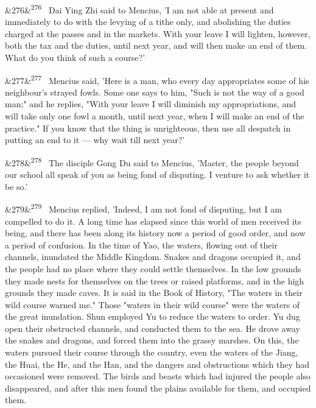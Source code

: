 \documentclass[12pt]{article}
\newcommand{\para}[1][]{\par\noindent\ifx&#1&\else\textsuperscript{\footnotesize #1}~\fi}
\begin{document}
\para[276] Dai Ying Zhi said to Mencius, 'I am not able at present and immediately to do with the levying of a tithe only, and abolishing the duties charged at the passes and in the markets. With your leave I will lighten, however, both the tax and the duties, until next year, and will then make an end of them. What do you think of such a course?'

\para[277] Mencius said, 'Here is a man, who every day appropriates some of his neighbour's strayed fowls. Some one says to him, "Such is not the way of a good man;" and he replies, "With your leave I will diminish my appropriations, and will take only one fowl a month, until next year, when I will make an end of the practice." If you know that the thing is unrighteous, then use all despatch in putting an end to it --- why wait till next year?'

\para[278] The disciple Gong Du said to Mencius, 'Master, the people beyond our school all speak of you as being fond of disputing. I venture to ask whether it be so.'

\para[279] Mencius replied, 'Indeed, I am not fond of disputing, but I am compelled to do it. A long time has elapsed since this world of men received its being, and there has been along its history now a period of good order, and now a period of confusion. In the time of Yao, the waters, flowing out of their channels, inundated the Middle Kingdom. Snakes and dragons occupied it, and the people had no place where they could settle themselves. In the low grounds they made nests for themselves on the trees or raised platforms, and in the high grounds they made caves. It is said in the Book of History, "The waters in their wild course warned me." Those "waters in their wild course" were the waters of the great inundation. Shun employed Yu to reduce the waters to order. Yu dug open their obstructed channels, and conducted them to the sea. He drove away the snakes and dragons, and forced them into the grassy marshes. On this, the waters pursued their course through the country, even the waters of the Jiang, the Huai, the He, and the Han, and the dangers and obstructions which they had occasioned were removed. The birds and beasts which had injured the people also disappeared, and after this men found the plains available for them, and occupied them.
\end{document}
